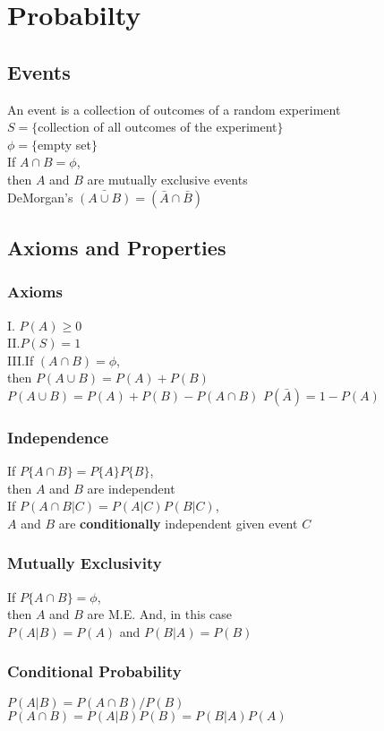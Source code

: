 \section*{Probabilty}
\subsection*{Events}
An event is a collection of outcomes of a random experiment \\
$S=\{$collection of all outcomes of the experiment$\}$ \\
$\phi = \{$empty set$\}$ \\
If $A\cap B=\phi$, \\ then $A$ and $B$ are mutually exclusive events\\
DeMorgan's $\bar{(A\cup B)} = (\bar{A}\cap \bar{B})$

\subsection*{Axioms and Properties}
\subsubsection*{Axioms}
I. $P(A)\geq 0$\\
II.\@ $P(S) = 1$ \\
III.\@ If $(A\cap B) = \phi$, \\then $P(A\cup B) = P(A) + P(B)$
$P(A\cup B)=P(A) + P(B) -P(A\cap B)$
$P(\bar{A})=1-P(A)$


\subsubsection*{Independence}
If $P\{A\cap B\} = P\{A\}P\{B\}$, \\then $A$ and $B$ are independent \\
If $P(A\cap B|C)=P(A|C)P(B|C)$, \\
$A$ and $B$ are {\bf conditionally} independent given event $C$ 

\subsubsection*{Mutually Exclusivity}
If $P\{A\cap B\} = \phi$, \\then $A$ and $B$ are M.E. 
And, in this case \\
$P(A|B)=P(A)$ and $P(B|A)=P(B)$


\subsubsection*{Conditional Probability}
$P(A|B)=P(A\cap B)/P(B)$
$P(A\cap B) = P(A|B)P(B) = P(B|A)P(A)$


